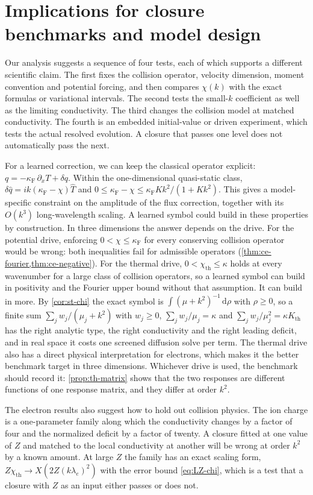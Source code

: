 \documentclass[11pt]{article}
\newcommand{\dd}{\,\mathrm d}
\newcommand{\F}{\kappa_{\mathrm F}}
\newcommand{\kap}{\kappa}
\newcommand{\thr}{\mathrm{th}}
\theoremstyle{definition}
\theoremstyle{remark}
\numberwithin{equation}{section}
\begin{document}
\section{Implications for closure benchmarks and model design}\label{sec:discussion}

Our analysis suggests a sequence of four tests, each of which supports
a different scientific claim. The first fixes the collision operator,
velocity dimension, moment convention and potential forcing, and then
compares $\chi(k)$ with the exact formulas or variational intervals.
The second tests the small-$k$ coefficient as well as the limiting
conductivity. The third changes the collision model at matched
conductivity. The fourth is an embedded initial-value or driven
experiment, which tests the actual resolved evolution. A closure that
passes one level does not automatically pass the next.

For a learned correction, we can keep the classical operator explicit:
$q=-\F\,\partial_xT+\delta q$.
Within the one-dimensional quasi-static class,
$\delta\widehat q=ik(\F-\chi)\widehat T$ and
$0\leq\F-\chi\leq\F Kk^2/(1+Kk^2)$.
This gives a model-specific constraint on the amplitude of the flux
correction, together with its $O(k^3)$ long-wavelength scaling.
A learned symbol could build in these properties by construction.
In three dimensions the answer depends on the drive. For the potential
drive, enforcing $0<\chi\leq\F$ for every conserving collision operator
would be wrong: both inequalities fail for admissible operators
(\cref{thm:ce-fourier,thm:ce-negative}). For
the thermal drive, $0<\chi_\thr\leq\kap$ holds at every wavenumber for a
large class of collision operators, so a learned symbol can build in
positivity and the Fourier upper bound without that assumption. It can
build in more. By \cref{cor:st-chi} the exact symbol is
$\int(\mu+k^2)^{-1}\dd\rho$ with $\rho\geq0$, so a finite sum
$\sum_jw_j/(\mu_j+k^2)$ with $w_j\geq0$, $\sum_jw_j/\mu_j=\kap$ and
$\sum_jw_j/\mu_j^2=\kap K_\thr$ has the right analytic type, the right
conductivity and the right leading deficit, and in real space it costs one
screened diffusion solve per term. The
thermal drive also has a direct physical interpretation for electrons,
which makes it the better benchmark target in three dimensions.
Whichever drive is used, the benchmark should record it:
\cref{prop:th-matrix} shows that the two responses are different
functions of one response matrix, and they differ at order $k^2$.

The electron results also suggest how to hold out collision physics. The
ion charge is a one-parameter family along which the conductivity changes
by a factor of four and the normalized deficit by a factor of twenty. A
closure fitted at one value of $Z$ and matched to the local conductivity
at another will be wrong at order $k^2$ by a known amount. At large $Z$
the family has an exact scaling form, $Z\chi_\thr\to X(2Z(k\lambda_e)^2)$
with the error bound \eqref{eq:LZ-chi}, which is a test that a closure
with $Z$ as an input either passes or does not.
\end{document}
